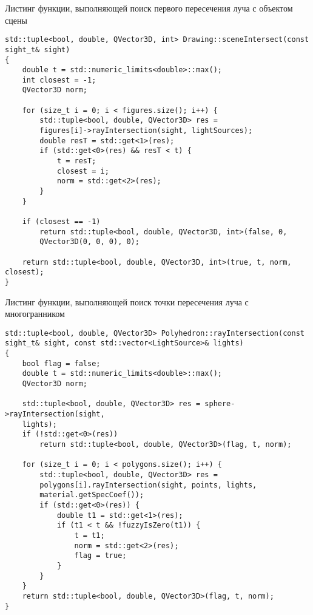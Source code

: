 \begin{code}
\caption{Листинг функции, выполняющей поиск первого пересечения луча с объектом сцены}
\label{code:5}
\begin{verbatim}
std::tuple<bool, double, QVector3D, int> Drawing::sceneIntersect(const 
sight_t& sight)
{
    double t = std::numeric_limits<double>::max();
    int closest = -1;
    QVector3D norm;

    for (size_t i = 0; i < figures.size(); i++) {
        std::tuple<bool, double, QVector3D> res = 
        figures[i]->rayIntersection(sight, lightSources);
        double resT = std::get<1>(res);
        if (std::get<0>(res) && resT < t) {
            t = resT;
            closest = i;
            norm = std::get<2>(res);
        }
    }

    if (closest == -1)
        return std::tuple<bool, double, QVector3D, int>(false, 0, 
        QVector3D(0, 0, 0), 0);

    return std::tuple<bool, double, QVector3D, int>(true, t, norm, closest);
}
\end{verbatim}
\end{code}

\begin{code}
\caption{Листинг функции, выполняющей поиск точки пересечения луча с многогранником}
\label{code:6}
\begin{verbatim}
std::tuple<bool, double, QVector3D> Polyhedron::rayIntersection(const 
sight_t& sight, const std::vector<LightSource>& lights)
{
    bool flag = false;
    double t = std::numeric_limits<double>::max();
    QVector3D norm;

    std::tuple<bool, double, QVector3D> res = sphere->rayIntersection(sight, 
    lights);
    if (!std::get<0>(res))
        return std::tuple<bool, double, QVector3D>(flag, t, norm);

    for (size_t i = 0; i < polygons.size(); i++) {
        std::tuple<bool, double, QVector3D> res = 
        polygons[i].rayIntersection(sight, points, lights, 
        material.getSpecCoef());
        if (std::get<0>(res)) {
            double t1 = std::get<1>(res);
            if (t1 < t && !fuzzyIsZero(t1)) {
                t = t1;
                norm = std::get<2>(res);
                flag = true;
            }
        }
    }
    return std::tuple<bool, double, QVector3D>(flag, t, norm);
}
\end{verbatim}
\end{code}

\newpage


